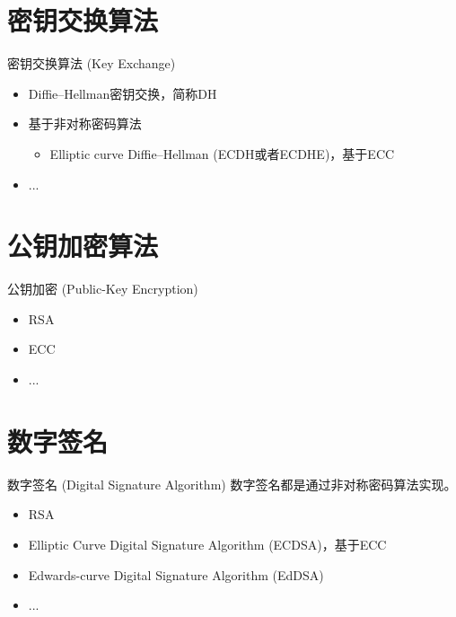 \documentclass[xcolor=svgnames,handout]{beamer}
\begin{document}
\section{密钥交换算法}
\begin{frame}
	{密钥交换算法 (Key Exchange)}
	\begin{itemize}
		\item Diffie–Hellman密钥交换，简称DH
		\item 基于非对称密码算法
		\begin{itemize}
			\item Elliptic curve Diffie–Hellman (ECDH或者ECDHE)，基于ECC
		\end{itemize}
	    \item ...
	\end{itemize}
\end{frame}

\section{公钥加密算法}
\begin{frame}
	{公钥加密 (Public-Key Encryption)}
	\begin{itemize}
		\item RSA
		\item ECC
		\item ...
	\end{itemize}
\end{frame}

\section{数字签名}
\begin{frame}
	{数字签名 (Digital Signature Algorithm)}
	数字签名都是通过非对称密码算法实现。
	\begin{itemize}
		\item RSA
		\item Elliptic Curve Digital Signature Algorithm (ECDSA)，基于ECC
		\item Edwards-curve Digital Signature Algorithm (EdDSA)
		\item ...
	\end{itemize}
\end{frame}
\end{document}
